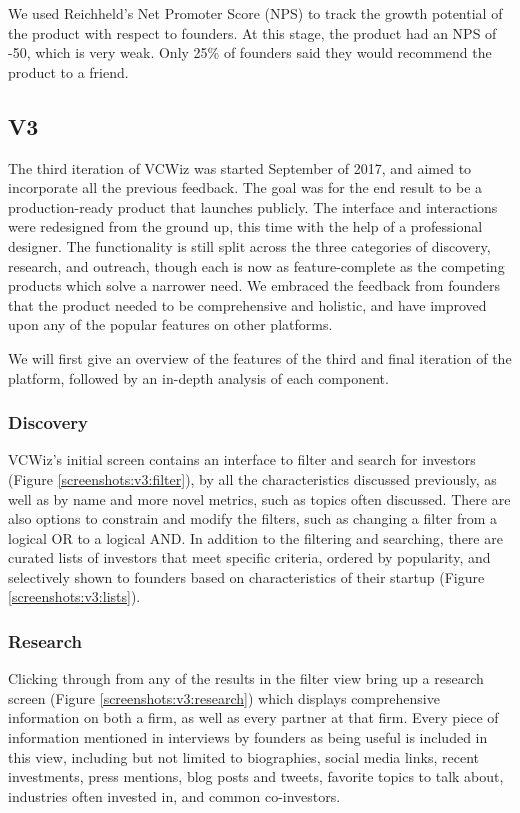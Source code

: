 We used Reichheld's Net Promoter Score (NPS) \cite{reichheld2003one} to track the growth potential of the product with respect to founders. At this stage, the product had an NPS of -50, which is very weak. Only 25\% of founders said they would recommend the product to a friend.

\subsection{V3}

The third iteration of VCWiz was started September of 2017, and aimed to incorporate all the previous feedback. The goal was for the end result to be a production-ready product that launches publicly. The interface and interactions were redesigned from the ground up, this time with the help of a professional designer. The functionality is still split across the three categories of discovery, research, and outreach, though each is now as feature-complete as the competing products which solve a narrower need. We embraced the feedback from founders that the product needed to be comprehensive and holistic, and have improved upon any of the popular features on other platforms.

We will first give an overview of the features of the third and final iteration of the platform, followed by an in-depth analysis of each component.

\subsubsection{Discovery}

VCWiz's initial screen contains an interface to filter and search for investors (Figure \ref{screenshots:v3:filter}), by all the characteristics discussed previously, as well as by name and more novel metrics, such as topics often discussed. There are also options to constrain and modify the filters, such as changing a filter from a logical OR to a logical AND. In addition to the filtering and searching, there are curated lists of investors that meet specific criteria, ordered by popularity, and selectively shown to founders based on characteristics of their startup (Figure \ref{screenshots:v3:lists}).

\subsubsection{Research}

Clicking through from any of the results in the filter view bring up a research screen (Figure \ref{screenshots:v3:research}) which displays comprehensive information on both a firm, as well as every partner at that firm. Every piece of information mentioned in interviews by founders as being useful is included in this view, including but not limited to biographies, social media links, recent investments, press mentions, blog posts and tweets, favorite topics to talk about, industries often invested in, and common co-investors.

